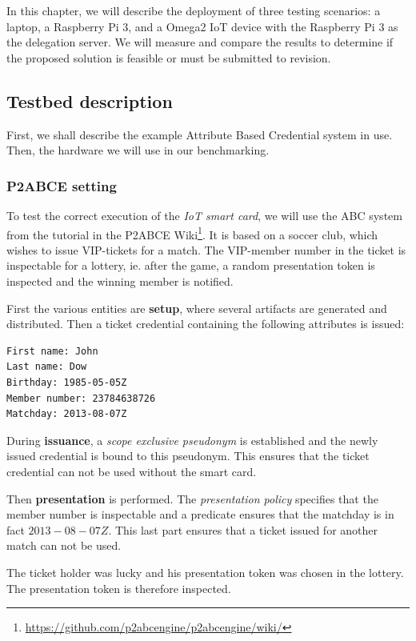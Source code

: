 \documentclass[journal]{IEEEtran}
\begin{document}
In this chapter, we will describe the deployment of three testing scenarios: a laptop, a Raspberry Pi 3, and a Omega2 IoT device with the Raspberry Pi 3 as the delegation server. We will measure and compare the results to determine if the proposed solution is feasible or must be submitted to revision.

\subsection{Testbed description}

First, we shall describe the example Attribute Based Credential system in use. Then, the hardware we will use in our benchmarking.

\subsubsection{P2ABCE setting}

To test the correct execution of the \textit{IoT smart card}, we will use the ABC system from the tutorial in the P2ABCE Wiki\footnote{\url{https://github.com/p2abcengine/p2abcengine/wiki/}}. It is based on a soccer club, which wishes to issue VIP-tickets for a match. The VIP-member number in the ticket is inspectable for a lottery, ie. after the game, a random presentation token is inspected and the winning member is notified.

First the various entities are \textbf{setup}, where several artifacts are generated and distributed. Then a ticket credential containing the following attributes is issued:

\begin{verbatim}
First name: John
Last name: Dow
Birthday: 1985-05-05Z
Member number: 23784638726
Matchday: 2013-08-07Z
\end{verbatim}

During \textbf{issuance}, a \textit{scope exclusive pseudonym} is established and the newly issued credential is bound to this pseudonym. This ensures that the ticket credential can not be used without the smart card.

Then \textbf{presentation} is performed. The \textit{presentation policy} specifies that the member number is inspectable and a predicate ensures that the matchday is in fact $2013-08-07Z$. This last part ensures that a ticket issued for another match can not be used.

The ticket holder was lucky and his presentation token was chosen in the lottery. The presentation token is therefore inspected.
\end{document}
